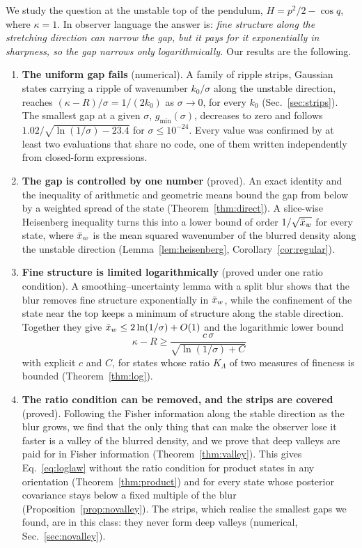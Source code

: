 We study the question at the unstable top of the pendulum, $H = p^2/2 - \cos q$, where $\kappa = 1$. In observer language the answer is: \emph{fine structure along the stretching direction can narrow the gap, but it pays for it exponentially in sharpness, so the gap narrows only logarithmically.} Our results are the following.
\begin{enumerate}
\item \textbf{The uniform gap fails} (numerical). A family of ripple strips, Gaussian states carrying a ripple of wavenumber $k_0/\sigma$ along the unstable direction, reaches $(\kappa - R)/\sigma = 1/(2k_0)$ as $\sigma\to 0$, for every $k_0$ (Sec.~\ref{sec:strips}). The smallest gap at a given $\sigma$, $g_{\min}(\sigma)$, decreases to zero and follows $1.02/\sqrt{\ln(1/\sigma) - 23.4}$ for $\sigma \leq 10^{-24}$. Every value was confirmed by at least two evaluations that share no code, one of them written independently from closed-form expressions.
\item \textbf{The gap is controlled by one number} (proved). An exact identity and the inequality of arithmetic and geometric means bound the gap from below by a weighted spread of the state (Theorem~\ref{thm:direct}). A slice-wise Heisenberg inequality turns this into a lower bound of order $1/\sqrt{\bar{x}_w}$ for every state, where $\bar{x}_w$ is the mean squared wavenumber of the blurred density along the unstable direction (Lemma~\ref{lem:heisenberg}, Corollary~\ref{cor:regular}).
\item \textbf{Fine structure is limited logarithmically} (proved under one ratio condition). A smoothing--uncertainty lemma with a split blur shows that the blur removes fine structure exponentially in $\bar{x}_w$, while the confinement of the state near the top keeps a minimum of structure along the stable direction. Together they give $\bar{x}_w \leq 2\ln(1/\sigma) + O(1)$ and the logarithmic lower bound
\begin{equation}
\kappa - R \geq \frac{c\,\sigma}{\sqrt{\ln(1/\sigma) + C}}
\label{eq:loglaw}
\end{equation}
with explicit $c$ and $C$, for states whose ratio $K_\Lambda$ of two measures of fineness is bounded (Theorem~\ref{thm:log}).
\item \textbf{The ratio condition can be removed, and the strips are covered} (proved). Following the Fisher information along the stable direction as the blur grows, we find that the only thing that can make the observer lose it faster is a valley of the blurred density, and we prove that deep valleys are paid for in Fisher information (Theorem~\ref{thm:valley}). This gives Eq.~\eqref{eq:loglaw} without the ratio condition for product states in any orientation (Theorem~\ref{thm:product}) and for every state whose posterior covariance stays below a fixed multiple of the blur (Proposition~\ref{prop:novalley}). The strips, which realise the smallest gaps we found, are in this class: they never form deep valleys (numerical, Sec.~\ref{sec:novalley}).
\end{enumerate}
